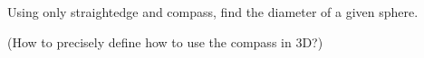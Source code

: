 Using only straightedge and compass,
find the diameter of a given sphere.

(How to precisely define how to use the compass in 3D?)
